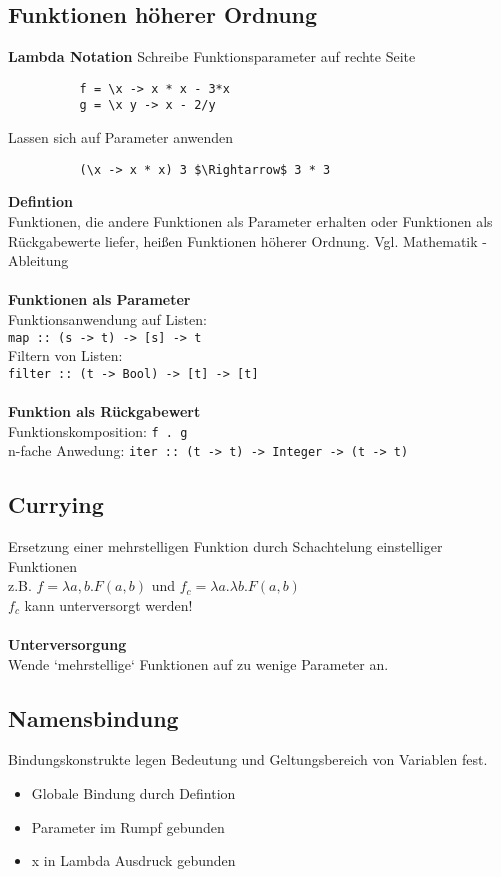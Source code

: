 \documentclass[10pt,a4paper,draft]{article}
\def\code#1{\texttt{#1}}
\begin{document}
        \subsection{Funktionen höherer Ordnung}
        \textbf{Lambda Notation}
        Schreibe Funktionsparameter auf rechte Seite
        \begin{lstlisting}
          f = \x -> x * x - 3*x
          g = \x y -> x - 2/y
        \end{lstlisting}
        Lassen sich auf Parameter anwenden
        \begin{lstlisting}
          (\x -> x * x) 3 $\Rightarrow$ 3 * 3
        \end{lstlisting}
        \textbf{Defintion}\\
        Funktionen, die andere Funktionen als Parameter erhalten oder Funktionen als Rückgabewerte liefer, heißen Funktionen höherer Ordnung.
        Vgl. Mathematik - Ableitung\\\\
        \textbf{Funktionen als Parameter}\\
        Funktionsanwendung auf Listen:\\
        \code{map :: (s -> t) -> [s] -> t}\\
        Filtern von Listen:\\
        \code{filter :: (t -> Bool) -> [t] -> [t]}\\\\
        \textbf{Funktion als Rückgabewert}\\
        Funktionskomposition: \code{f . g}\\
        n-fache Anwedung: \code{iter :: (t -> t) -> Integer -> (t -> t)}

        \subsection{Currying}
        Ersetzung einer mehrstelligen Funktion durch Schachtelung einstelliger Funktionen\\
        z.B. \(f = \lambda a, b.F(a,b)\) und \(f_c = \lambda a.\lambda b. F(a, b)\)\\
        \(f_c\) kann unterversorgt werden!\\\\
        \textbf{Unterversorgung}\\
        Wende `mehrstellige` Funktionen auf zu wenige Parameter an.

        \subsection{Namensbindung}
        Bindungskonstrukte legen Bedeutung und Geltungsbereich von Variablen fest.
        \begin{itemize}
          \item Globale Bindung durch Defintion
          \item Parameter im Rumpf gebunden
          \item x in Lambda Ausdruck gebunden
        \end{itemize}
\end{document}
